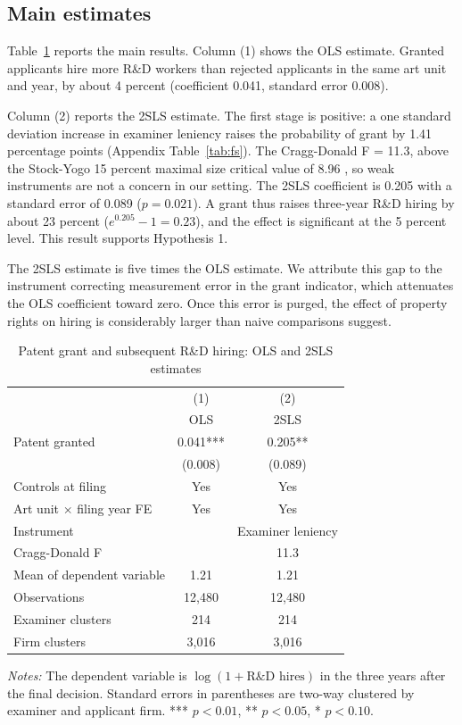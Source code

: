 \documentclass[11pt]{article}
\begin{document}
\subsection{Main estimates}

Table~\ref{tab:main} reports the main results. Column (1) shows the OLS estimate. Granted applicants hire more R\&D workers than rejected applicants in the same art unit and year, by about 4 percent (coefficient 0.041, standard error 0.008).

Column (2) reports the 2SLS estimate. The first stage is positive: a one standard deviation increase in examiner leniency raises the probability of grant by 1.41 percentage points (Appendix Table~\ref{tab:fs}). The Cragg-Donald F = 11.3, above the Stock-Yogo 15 percent maximal size critical value of 8.96 \citep{cragg1993,stock2005}, so weak instruments are not a concern in our setting. The 2SLS coefficient is 0.205 with a standard error of 0.089 ($p = 0.021$). A grant thus raises three-year R\&D hiring by about 23 percent ($e^{0.205} - 1 = 0.23$), and the effect is significant at the 5 percent level. This result supports Hypothesis 1.

The 2SLS estimate is five times the OLS estimate. We attribute this gap to the instrument correcting measurement error in the grant indicator, which attenuates the OLS coefficient toward zero. Once this error is purged, the effect of property rights on hiring is considerably larger than naive comparisons suggest.

\begin{table}[htbp]
\centering
\begin{threeparttable}
\caption{Patent grant and subsequent R\&D hiring: OLS and 2SLS estimates}
\label{tab:main}
\small
\begin{tabular}{lcc}
\toprule
 & (1) & (2) \\
 & OLS & 2SLS \\
\midrule
Patent granted & 0.041*** & 0.205** \\
 & (0.008) & (0.089) \\[0.5em]
Controls at filing & Yes & Yes \\
Art unit $\times$ filing year FE & Yes & Yes \\
Instrument & & Examiner leniency \\
Cragg-Donald F & & 11.3 \\
Mean of dependent variable & 1.21 & 1.21 \\
Observations & 12,480 & 12,480 \\
Examiner clusters & 214 & 214 \\
Firm clusters & 3,016 & 3,016 \\
\bottomrule
\end{tabular}
\begin{tablenotes}\footnotesize
\item \textit{Notes:} The dependent variable is $\log(1 + \text{R\&D hires})$ in the three years after the final decision. Standard errors in parentheses are two-way clustered by examiner and applicant firm. *** $p<0.01$, ** $p<0.05$, * $p<0.10$.
\end{tablenotes}
\end{threeparttable}
\end{table}
\end{document}
